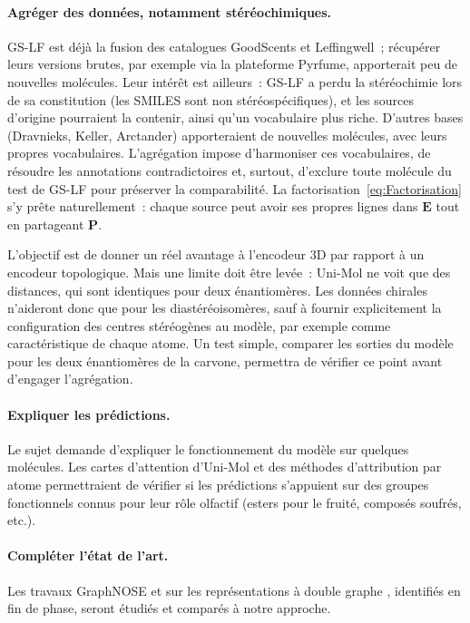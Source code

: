 \paragraph{Agréger des données, notamment stéréochimiques.}
GS-LF est déjà la fusion des catalogues GoodScents et Leffingwell~; récupérer leurs versions brutes, par exemple via la plateforme Pyrfume, apporterait peu de nouvelles molécules.
Leur intérêt est ailleurs~: GS-LF a perdu la stéréochimie lors de sa constitution (les SMILES sont non stéréospécifiques), et les sources d'origine pourraient la contenir, ainsi qu'un vocabulaire plus riche.
D'autres bases (Dravnieks, Keller, Arctander) apporteraient de nouvelles molécules, avec leurs propres vocabulaires.
L'agrégation impose d'harmoniser ces vocabulaires, de résoudre les annotations contradictoires et, surtout, d'exclure toute molécule du test de GS-LF pour préserver la comparabilité.
La factorisation~\eqref{eq:Factorisation} s'y prête naturellement~: chaque source peut avoir ses propres lignes dans $\mathbf{E}$ tout en partageant $\mathbf{P}$.

L'objectif est de donner un réel avantage à l'encodeur 3D par rapport à un encodeur topologique.
Mais une limite doit être levée~: Uni-Mol ne voit que des distances, qui sont identiques pour deux énantiomères.
Les données chirales n'aideront donc que pour les diastéréoisomères, sauf à fournir explicitement la configuration des centres stéréogènes au modèle, par exemple comme caractéristique de chaque atome.
Un test simple, comparer les sorties du modèle pour les deux énantiomères de la carvone, permettra de vérifier ce point avant d'engager l'agrégation.

\paragraph{Expliquer les prédictions.}
Le sujet demande d'expliquer le fonctionnement du modèle sur quelques molécules.
Les cartes d'attention d'Uni-Mol et des méthodes d'attribution par atome permettraient de vérifier si les prédictions s'appuient sur des groupes fonctionnels connus pour leur rôle olfactif (esters pour le fruité, composés soufrés, etc.).

\paragraph{Compléter l'état de l'art.}
Les travaux GraphNOSE \cite{Sharma-2026} et sur les représentations à double graphe \cite{Zhang-2026}, identifiés en fin de phase, seront étudiés et comparés à notre approche.
